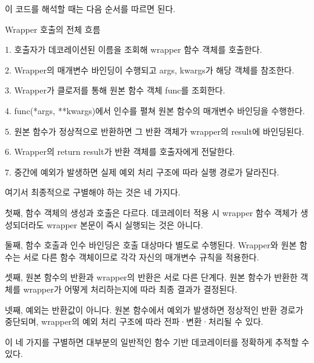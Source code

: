 이 코드를 해석할 때는 다음 순서를 따르면 된다.

\begin{dhksmry}
Wrapper 호출의 전체 흐름

1. 호출자가 데코레이션된 이름을 조회해 wrapper 함수 객체를 호출한다.

2. Wrapper의 매개변수 바인딩이 수행되고 args, kwargs가 해당 객체를
   참조한다.

3. Wrapper가 클로저를 통해 원본 함수 객체 func를 조회한다.

4. func(*args, **kwargs)에서 인수를 펼쳐 원본 함수의 매개변수
   바인딩을 수행한다.

5. 원본 함수가 정상적으로 반환하면 그 반환 객체가 wrapper의 result에
   바인딩된다.

6. Wrapper의 return result가 반환 객체를 호출자에게 전달한다.

7. 중간에 예외가 발생하면 실제 예외 처리 구조에 따라 실행 경로가 달라진다.
\end{dhksmry}

여기서 최종적으로 구별해야 하는 것은 네 가지다.

첫째, 함수 객체의 생성과 호출은 다르다. 데코레이터 적용 시 wrapper 함수 객체가 생성되더라도 wrapper 본문이 즉시 실행되는 것은 아니다.

둘째, 함수 호출과 인수 바인딩은 호출 대상마다 별도로 수행된다. Wrapper와 원본 함수는 서로 다른 함수 객체이므로 각각 자신의 매개변수 규칙을 적용한다.

셋째, 원본 함수의 반환과 wrapper의 반환은 서로 다른 단계다. 원본 함수가 반환한 객체를 wrapper가 어떻게 처리하는지에 따라 최종 결과가 결정된다.

넷째, 예외는 반환값이 아니다. 원본 함수에서 예외가 발생하면 정상적인 반환 경로가 중단되며, wrapper의 예외 처리 구조에 따라 전파·변환·처리될 수 있다.

이 네 가지를 구별하면 대부분의 일반적인 함수 기반 데코레이터를 정확하게 추적할 수 있다.